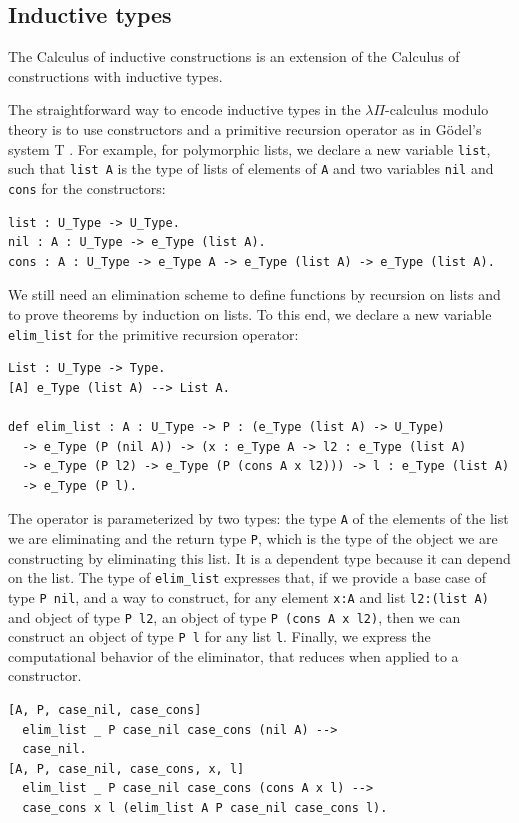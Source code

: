 \documentclass[english]{lipics}
\newcommand\lst[1]{{\rm \lstinline{#1}}}
\begin{document}
\subsection{Inductive types}
\label{inductives}

The Calculus of inductive constructions is an extension of the
Calculus of constructions with inductive types.

The straightforward way to encode inductive types in the
$\lambda\Pi$-calculus modulo theory is to use constructors and a
primitive recursion operator as in G\"odel's system T \cite{Godel58}.
For example, for polymorphic lists, we declare a new
variable \lst{list}, such that \lst{list A} is the
type of lists of elements of \lst{A} and two variables
\lst{nil} and \lst{cons} for the constructors:
\begin{lstlisting}
list : U_Type -> U_Type.
nil : A : U_Type -> e_Type (list A).
cons : A : U_Type -> e_Type A -> e_Type (list A) -> e_Type (list A).
\end{lstlisting}

We still need an elimination scheme to define functions by recursion on lists and to prove theorems by induction on lists. To this end, we declare a new
variable \lst{elim_list} for the primitive recursion operator:
\begin{lstlisting}
List : U_Type -> Type.
[A] e_Type (list A) --> List A.

def elim_list : A : U_Type -> P : (e_Type (list A) -> U_Type)
  -> e_Type (P (nil A)) -> (x : e_Type A -> l2 : e_Type (list A)
  -> e_Type (P l2) -> e_Type (P (cons A x l2))) -> l : e_Type (list A)
  -> e_Type (P l).
\end{lstlisting}

The operator is parameterized by two types: the type \lst{A} of the
elements of the list we are eliminating and the return type \lst{P},
which is the type of the object we are constructing by eliminating this list.
It is a dependent type because it can depend on the list. The type of
\lst{elim_list} expresses that, if we provide a base case of type
\lst{P nil}, and a way to construct, for any element
\lst{x:A} and list \lst{l2:(list A)} and object of type
\lst{P l2}, an object of type \lst{P (cons A x l2)}, then we
can construct an object of type \lst{P l} for any list \lst{l}.
Finally, we express the computational behavior of the
eliminator, that reduces when applied to a constructor.
\begin{lstlisting}
[A, P, case_nil, case_cons]
  elim_list _ P case_nil case_cons (nil A) -->
  case_nil.
[A, P, case_nil, case_cons, x, l]
  elim_list _ P case_nil case_cons (cons A x l) -->
  case_cons x l (elim_list A P case_nil case_cons l).
\end{lstlisting}
\end{document}

